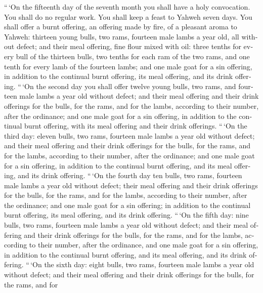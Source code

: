 \begin{paracol}{2}
\begin{otherlanguage}{english}
 ``\,`On the fifteenth day of the seventh month you shall
have a holy convocation. You shall do no regular work. You shall keep a
feast to Yahweh seven days.  You shall offer a burnt
offering, an offering made by fire, of a pleasant aroma to Yahweh:
thirteen young bulls, two rams, fourteen male lambs a year old, all
without defect;  and their meal offering, fine flour
mixed with oil: three tenths for every bull of the thirteen bulls, two
tenths for each ram of the two rams,  and one tenth for
every lamb of the fourteen lambs;  and one male goat for
a sin offering, in addition to the continual burnt offering, its meal
offering, and its drink offering.  ``\,`On the second day
you shall offer twelve young bulls, two rams, and fourteen male lambs a
year old without defect;  and their meal offering and
their drink offerings for the bulls, for the rams, and for the lambs,
according to their number, after the ordinance;  and one
male goat for a sin offering, in addition to the continual burnt
offering, with its meal offering and their drink offerings.
 ``\,`On the third day: eleven bulls, two rams, fourteen
male lambs a year old without defect;  and their meal
offering and their drink offerings for the bulls, for the rams, and for
the lambs, according to their number, after the ordinance;
 and one male goat for a sin offering, in addition to the
continual burnt offering, and its meal offering, and its drink offering.
 ``\,`On the fourth day ten bulls, two rams, fourteen
male lambs a year old without defect;  their meal
offering and their drink offerings for the bulls, for the rams, and for
the lambs, according to their number, after the ordinance;
 and one male goat for a sin offering; in addition to the
continual burnt offering, its meal offering, and its drink offering.
 ``\,`On the fifth day: nine bulls, two rams, fourteen
male lambs a year old without defect;  and their meal
offering and their drink offerings for the bulls, for the rams, and for
the lambs, according to their number, after the ordinance,
 and one male goat for a sin offering, in addition to the
continual burnt offering, and its meal offering, and its drink offering.
 ``\,`On the sixth day: eight bulls, two rams, fourteen
male lambs a year old without defect;  and their meal
offering and their drink offerings for the bulls, for the rams, and for

\end{otherlanguage}
\end{paracol}
